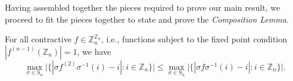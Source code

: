 Having assembled together the pieces required to prove our main result, we proceed to fit the pieces together to state and prove the \textit{Composition Lemma}.
\begin{lemma}\label{lem:composition-lemma}
 For all contractive  $f\in\mathbb{Z}_{n}^{\mathbb{Z}_{n}}$, i.e., functions subject to the fixed point condition
$\left|f^{\left(n-1\right)}\left(\mathbb{Z}_{n}\right)\right|=1$,
we have
\begin{equation}\label{eq:composition-lemma}
\max_{\sigma\in\text{S}_{n}}\big|\{|\sigma f^{(2)}\sigma^{-1}(i)-i|:i\in\mathbb{Z}_{n}\}\big|\le\max_{\sigma\in\text{S}_{n}}\big|\{|\sigma f\sigma^{-1}(i)-i|:i\in\mathbb{Z}_{n}\}\big|.
\end{equation}
\end{lemma}
